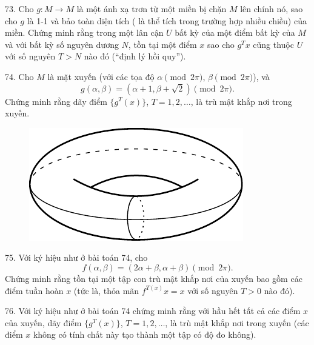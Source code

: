 \begin{problem}{73.}
	Cho $g\colon M \to M$ là một ánh xạ trơn từ một miền bị chặn $M$ lên chính nó, sao cho $g$ là 1-1 và bảo toàn diện tích ( là thể tích trong trường hợp nhiều chiều) của miền. Chứng minh rằng trong một lân cận $U$ bất kỳ của một điểm bất kỳ của $M$ và với bất kỳ số nguyên dương $N$, tồn tại một điểm $x$ sao cho $g^T x$ cũng thuộc $U$ với số nguyên $T>N$ nào đó (\enquote{định lý hồi quy}).
\end{problem}

\begin{problem}{74.}
	Cho $M$ là mặt xuyến (với các tọa độ $\alpha \pmod{2\pi}$, $\beta \pmod{2\pi}$), và
	\begin{equation*}
		g(\alpha, \beta)=(\alpha+1, \beta+ \sqrt{2}) \pmod{2\pi}.
	\end{equation*}
	Chứng minh rằng dãy điểm $\{g^T (x)\}$, $T=1, 2, \dotsc$, là trù mật khắp nơi trong xuyến.
	\begin{figure}
		\includegraphics{resources/74_torus}
	\end{figure}
\end{problem}

\begin{problem}{75.}
	Với ký hiệu như ở bài toán 74, cho
	\begin{equation*}
		f(\alpha, \beta)=(2\alpha+\beta,\alpha+\beta) \pmod{2\pi}.
	\end{equation*}
	Chứng minh rằng tồn tại một tập con trù mật khắp nơi của xuyến bao gồm các điểm tuần hoàn $x$ (tức là, thỏa mãn $f^{T(x)} x=x$ với số nguyên $T>0$ nào đó).
\end{problem}

\begin{problem}{76.}
	Với ký hiệu như ở bài toán 74 chứng minh rằng với hầu hết tất cả các điểm $x$ của xuyến, dãy điểm $\{g^T (x)\}$, $T=1, 2, \dotsc$, là trù mật khắp nơi trong xuyến (các điểm $x$ không có tính chất này tạo thành một tập có độ đo không).
\end{problem}

